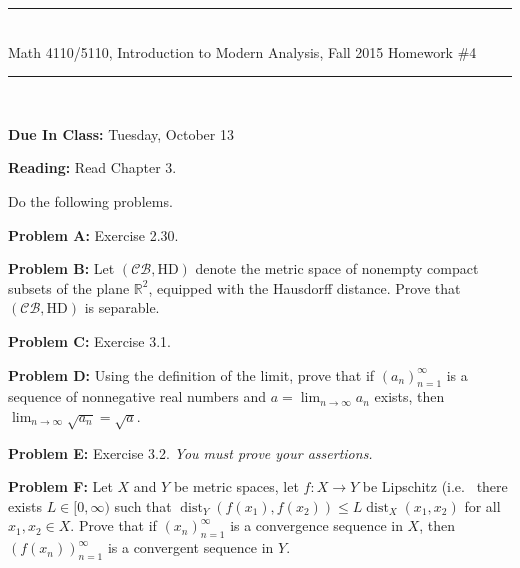 \documentclass[11pt,reqno]{amsart}
\newcommand{\RR}{\mathbb{R}}
\newcommand{\spacer}{\vspace{.4cm}}
\newcommand{\dist}{\mathop\mathrm{dist}\nolimits}
\begin{document}
\begin{center}
\hrule \ \\
\large \textsf{Math 4110/5110, Introduction to Modern Analysis, Fall 2015} \hfill
\Large Homework \#4 \vspace{.25cm} \hrule \
\end{center}

\spacer

\textbf{Due In Class:} Tuesday, October 13  \spacer

\textbf{Reading:} Read Chapter 3.  \spacer

Do the following problems. \spacer

\textbf{Problem A:} Exercise 2.30. \spacer

\textbf{Problem B:} Let $(\mathcal{CB},\mathrm{HD})$ denote the metric space of nonempty compact subsets of the plane $\RR^2$, equipped with the Hausdorff distance. Prove that $(\mathcal{CB},\mathrm{HD})$ is separable. \spacer

\textbf{Problem C:} Exercise 3.1. \spacer

\textbf{Problem D:} Using the definition of the limit, prove that if $(a_n)_{n=1}^\infty$ is a sequence of nonnegative real numbers and $a=\lim_{n\rightarrow\infty} a_n$ exists, then $\lim_{n\rightarrow\infty} \sqrt{a_n}=\sqrt{a}$. \spacer

\textbf{Problem E:} Exercise 3.2. \emph{You must prove your assertions.} \spacer

\textbf{Problem F:} Let $X$ and $Y$ be metric spaces, let $f:X\rightarrow Y$ be Lipschitz (i.e.~ there exists $L\in[0,\infty)$ such that $\dist_Y(f(x_1),f(x_2))\leq L \dist_X(x_1,x_2)$ for all $x_1,x_2\in X$. Prove that if $(x_n)_{n=1}^\infty$ is a convergence sequence in $X$, then $(f(x_n))_{n=1}^\infty$ is a convergent sequence in $Y$.
\end{document}
